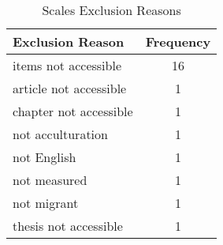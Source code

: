 \begin{table}
\begin{minipage}[t][\textheight][t]{\textwidth}

\caption{\label{tab:ScalesExclusion}Scales Exclusion Reasons}
\begin{tabular}[t]{lc}
\toprule
Exclusion Reason & Frequency\\
\midrule
items not accessible & 16\\
article not accessible & 1\\
chapter not accessible & 1\\
not acculturation & 1\\
not English & 1\\
not measured & 1\\
not migrant & 1\\
thesis not accessible & 1\\
\bottomrule
\end{tabular}
\end{minipage}
\end{table}
